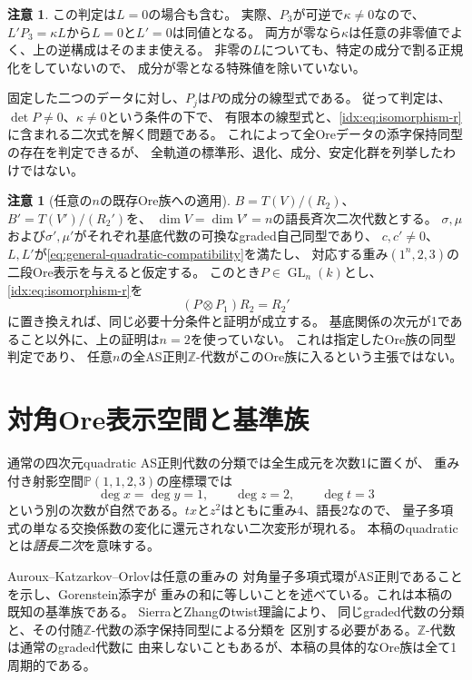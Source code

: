 \documentclass[11pt,a4paper]{ltjsarticle}
\theoremstyle{definition}
\newcommand{\GL}{\operatorname{GL}}
\newtheorem{remark}[theorem]{注意}
\begin{document}
\begin{remark}
この判定は$L=0$の場合も含む。
実際、$P_3$が可逆で$\kappa\ne0$なので、
$L'P_3=\kappa L$から$L=0$と$L'=0$は同値となる。
両方が零なら$\kappa$は任意の非零値でよく、上の逆構成はそのまま使える。
非零の$L$についても、特定の成分で割る正規化をしていないので、
成分が零となる特殊値を除いていない。

固定した二つのデータに対し、$P_j$は$P$の成分の線型式である。
従って判定は、$\det P\ne0$、$\kappa\ne0$という条件の下で、
有限本の線型式と、\eqref{idx:eq:isomorphism-r}に含まれる二次式を解く問題である。
これによって全Oreデータの添字保持同型の存在を判定できるが、
全軌道の標準形、退化、成分、安定化群を列挙したわけではない。
\end{remark}

\begin{remark}[任意の$n$の既存Ore族への適用]
$B=T(V)/(R_2)$、$B'=T(V')/(R_2')$を、
$\dim V=\dim V'=n$の語長斉次二次代数とする。
$\sigma,\mu$および$\sigma',\mu'$がそれぞれ基底代数の可換なgraded自己同型であり、
$c,c'\ne0$、$L,L'$が\eqref{eq:general-quadratic-compatibility}を満たし、
対応する重み$(1^n,2,3)$の二段Ore表示を与えると仮定する。
このとき$P\in\GL_n(k)$とし、\eqref{idx:eq:isomorphism-r}を
\[
(P\otimes P_1)R_2=R_2'
\]
に置き換えれば、同じ必要十分条件と証明が成立する。
基底関係の次元が1であること以外に、上の証明は$n=2$を使っていない。
これは指定したOre族の同型判定であり、
任意$n$の全AS正則$\mathbb Z$-代数がこのOre族に入るという主張ではない。
\end{remark}

\section{対角Ore表示空間と基準族}\label{sec:diagonal-chart}
通常の四次元quadratic AS正則代数の分類では全生成元を次数1に置くが、
重み付き射影空間$\mathbb P(1,1,2,3)$の座標環では
\[
\deg x=\deg y=1,\qquad\deg z=2,\qquad\deg t=3
\]
という別の次数が自然である。$tx$と$z^2$はともに重み4、語長2なので、
量子多項式の単なる交換係数の変化に還元されない二次変形が現れる。
本稿のquadraticとは\emph{語長二次}を意味する。

Auroux--Katzarkov--Orlov\cite[Proposition~2.6]{AKO}は任意の重みの
対角量子多項式環がAS正則であることを示し、Gorenstein添字が
重みの和に等しいことを述べている。これは本稿の既知の基準族である。
Sierra\cite[Theorem~1.2]{Sierra}とZhang\cite{Zhang}のtwist理論により、
同じgraded代数の分類と、その付随$\mathbb Z$-代数の添字保持同型による分類を
区別する必要がある。$\mathbb Z$-代数は通常のgraded代数に
由来しないこともあるが、本稿の具体的なOre族は全て1周期的である。
\end{document}
